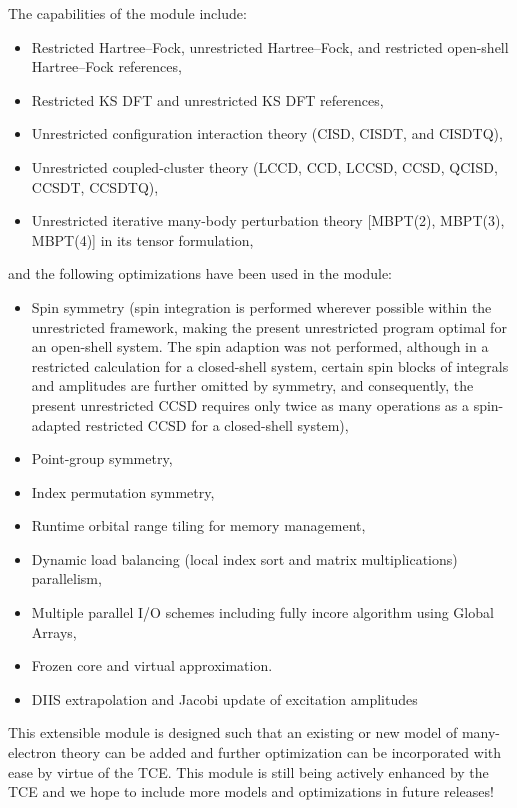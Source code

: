 The capabilities of the module include:
\begin{itemize}
\item Restricted Hartree--Fock, unrestricted Hartree--Fock, and restricted open-shell
Hartree--Fock references,
\item Restricted KS DFT and unrestricted KS DFT references,
\item Unrestricted configuration interaction theory (CISD, CISDT, and CISDTQ),
\item Unrestricted coupled-cluster theory (LCCD, CCD, LCCSD, CCSD, QCISD, CCSDT, CCSDTQ),
\item Unrestricted iterative many-body perturbation theory [MBPT(2), MBPT(3), MBPT(4)] in its tensor formulation,
\end{itemize}
and the following optimizations have been used in the module:
\begin{itemize}
\item Spin symmetry (spin integration is performed wherever possible within the
unrestricted framework, making the present unrestricted program 
optimal for an open-shell system.  The spin adaption was not performed, 
although in a restricted calculation for a closed-shell system, certain spin blocks of 
integrals and amplitudes are further omitted by symmetry, and
consequently, the present unrestricted CCSD requires only twice
as many operations as a spin-adapted restricted CCSD for a closed-shell system),
\item Point-group symmetry,
\item Index permutation symmetry,
\item Runtime orbital range tiling for memory management,
\item Dynamic load balancing (local index sort and matrix multiplications) parallelism,
\item Multiple parallel I/O schemes including fully incore algorithm using Global Arrays,
\item Frozen core and virtual approximation.
\item DIIS extrapolation and Jacobi update of excitation amplitudes
\end{itemize}

This extensible module is designed such that an existing or new model of many-electron
theory can be added and further optimization can be incorporated with ease 
by virtue of the TCE.
This module is still being
actively enhanced by the TCE and we hope to include more models and optimizations
in future releases!

